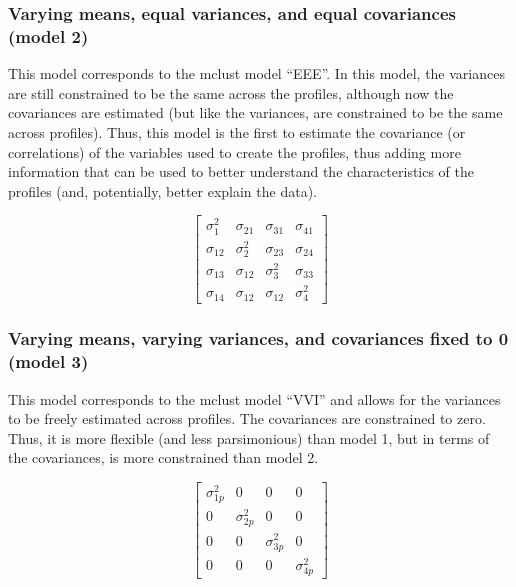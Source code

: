 \documentclass[]{msu-thesis}
\theoremstyle{definition}
\theoremstyle{definition}
\theoremstyle{definition}
\theoremstyle{remark}
\begin{document}
\subsubsection{Varying means, equal variances, and equal covariances
(model
2)}\label{varying-means-equal-variances-and-equal-covariances-model-2}

This model corresponds to the mclust model ``EEE''. In this model, the
variances are still constrained to be the same across the profiles,
although now the covariances are estimated (but like the variances, are
constrained to be the same across profiles). Thus, this model is the
first to estimate the covariance (or correlations) of the variables used
to create the profiles, thus adding more information that can be used to
better understand the characteristics of the profiles (and, potentially,
better explain the data).

\[
\left[ \begin{matrix} { \sigma  }_{ 1 }^{ 2 } & { \sigma  }_{ 21 } & { \sigma  }_{ 31 } & { \sigma  }_{ 41 } \\ { \sigma  }_{ 12 } & { \sigma  }_{ 2 }^{ 2 } & { \sigma  }_{ 23 } & { \sigma  }_{ 24 } \\ { \sigma  }_{ 13 } & { \sigma  }_{ 12 } & { \sigma  }_{ 3 }^{ 2 } & { \sigma  }_{ 33 } \\ { \sigma  }_{ 14 } & { \sigma  }_{ 12 } & { \sigma  }_{ 12 } & { \sigma  }_{ 4 }^{ 2 } \end{matrix} \right] 
\]

\subsubsection{Varying means, varying variances, and covariances fixed
to 0 (model
3)}\label{varying-means-varying-variances-and-covariances-fixed-to-0-model-3}

This model corresponds to the mclust model ``VVI'' and allows for the
variances to be freely estimated across profiles. The covariances are
constrained to zero. Thus, it is more flexible (and less parsimonious)
than model 1, but in terms of the covariances, is more constrained than
model 2.

\[ 
\left[ \begin{matrix} { \sigma  }_{ 1p }^{ 2 } & 0 & 0 & 0 \\ 0 & { \sigma  }_{ 2p }^{ 2 } & 0 & 0 \\ 0 & 0 & { \sigma  }_{ 3p }^{ 2 } & 0 \\ 0 & 0 & 0 & { \sigma  }_{ 4p }^{ 2 } \end{matrix} \right] 
\]
\end{document}
